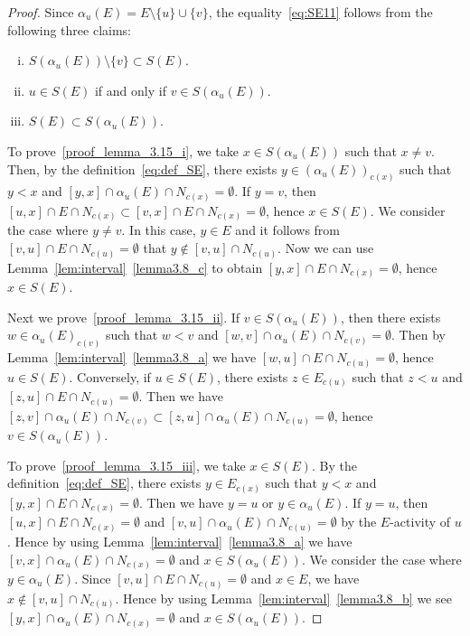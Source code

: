 \documentclass[10pt]{amsart}
\theoremstyle{definition}
\theoremstyle{remark}
\begin{document}
\begin{proof}
Since $\alpha_u(E) = E \setminus \{ u \} \cup \{ v \}$, the equality~\eqref{eq:SE11} 
follows from the following three claims:
\begin{enumerate}[(i)]
\item\label{proof_lemma_3.15_i} %
$S(\alpha_u(E)) \setminus \{ v \} \subset S(E)$.
\item\label{proof_lemma_3.15_ii} %
$u \in S(E)$ if and only if $v \in S(\alpha_u(E))$.
\item\label{proof_lemma_3.15_iii} %
$S(E) \subset S(\alpha_u(E))$.
\end{enumerate}

To prove~\ref{proof_lemma_3.15_i}, we take $x \in S(\alpha_u(E))$ such that $x \neq v$.
Then, by the definition~\eqref{eq:def_SE}, there exists $y \in (\alpha_u(E))_{c(x)}$ such that $y<x$ 
and $[y,x] \cap \alpha_u(E) \cap N_{c(x)} = \emptyset$.
If $y = v$, then $[u,x] \cap E \cap N_{c(x)} \subset [v,x] \cap E \cap N_{c(x)} = \emptyset$, 
hence $x \in S(E)$.
We consider the case where $y \neq v$.
In this case, $y \in E$ and it follows from $[v,u] \cap E \cap N_{c(u)} = \emptyset$ 
that $y \not\in [v,u] \cap N_{c(u)}$.
Now we can use Lemma~\ref{lem:interval}~\ref{lemma3.8_c} to obtain $[y,x] \cap E \cap N_{c(x)} = \emptyset$, 
hence $x \in S(E)$.

Next we prove~\ref{proof_lemma_3.15_ii}.
If $v\in S(\alpha_u(E))$, then there exists $w \in \alpha_u(E)_{c(v)}$ such that 
$w<v$ and $[w,v] \cap \alpha_u(E) \cap N_{c(v)} = \emptyset$.
Then by Lemma~\ref{lem:interval}~\ref{lemma3.8_a} we have $[w,u] \cap E \cap N_{c(u)} = \emptyset$, 
hence $u \in S(E)$.
Conversely, 
if $u \in S(E)$, there exists $z \in E_{c(u)}$ such that $z < u$ and $[z,u] \cap E \cap N_{c(u)} = \emptyset$.
Then we have $[z,v] \cap \alpha_u(E) \cap N_{c(v)} \subset [z,u] \cap \alpha_u(E) \cap N_{c(u)} = \emptyset$, 
hence $v \in S(\alpha_u(E))$.

To prove~\ref{proof_lemma_3.15_iii}, we take $x \in S(E)$.
By the definition~\eqref{eq:def_SE}, 
there exists $y \in E_{c(x)}$ such that $y<x$ and $[y,x] \cap E \cap N_{c(x)} = \emptyset$.
Then we have $y = u$ or $y \in \alpha_u(E)$.
If $y=u$, then $[u,x] \cap E \cap N_{c(x)} = \emptyset$ and 
$[v,u] \cap \alpha_u(E) \cap N_{c(u)} = \emptyset$ by the $E$-activity of $u$.
Hence by using Lemma~\ref{lem:interval}~\ref{lemma3.8_a} we have $[v,x] \cap \alpha_u(E) \cap N_{c(x)} = \emptyset$ 
and $x \in S(\alpha_u(E))$.
We consider the case where $y \in \alpha_u(E)$.
Since $[v,u] \cap E \cap N_{c(u)} = \emptyset$ and $x \in E$, we have $x \not\in [v,u] \cap N_{c(u)}$.
Hence by using Lemma~\ref{lem:interval}~\ref{lemma3.8_b} we see $[y,x] \cap \alpha_u(E) \cap N_{c(x)} = \emptyset$ 
and $x \in S(\alpha_u(E))$.


\end{proof}
\end{document}
